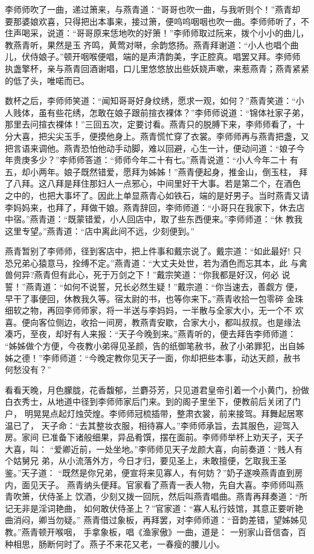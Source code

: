 李师师吹了一曲，递过箫来，与燕青道：“哥哥也吹一曲，与我听则个！”燕青却
要那婆娘欢喜，只得把出本事来，接过箫，便呜呜咽咽也吹一曲。李师师听了，不
住声喝采，说道：“哥哥原来恁地吹的好箫！”李师师取过阮来，拨个小小的曲儿，
教燕青听，果然是玉齐鸣，黄莺对啭，余韵悠扬。燕青拜谢道：“小人也唱个曲
儿，伏侍娘子。”顿开咽喉便唱，端的是声清韵美，字正腔真。唱罢又拜。李师师
执盏擎杯，亲与燕青回酒谢唱，口儿里悠悠放出些妖娆声嗽，来惹燕青；燕青紧紧
的低了头，唯喏而已。

数杯之后，李师师笑道：“闻知哥哥好身纹绣，愿求一观，如何？”燕青笑道：“小
人贱体，虽有些花绣，怎敢在娘子跟前揎衣裸体？”李师师说道：“锦体社家子弟，
那里去问揎衣裸体！”三回五次，定要讨看。燕青只的脱膊下来，李师师看了，十
分大喜，把尖尖玉手，便摸他身上。燕青慌忙穿了衣裳。李师师再与燕青把盏，又
把言语来调他。燕青恐怕他动手动脚，难以回避，心生一计，便动问道：“娘子今
年贵庚多少？”李师师答道：“师师今年二十有七。”燕青说道：“小人今年二十
有五，却小两年。娘子既然错爱，愿拜为姊姊！”燕青便起身，推金山，倒玉柱，
拜了八拜。这八拜是拜住那妇人一点邪心，中间里好干大事。若是第二个，在酒色
之中的，也把大事坏了。因此上单显燕青心如铁石，端的是好男子。当时燕青又请
李妈妈来，也拜了，拜做干娘。燕青辞回，李师师道：“小哥只在我家下，休去店
中宿。”燕青道：“既蒙错爱，小人回店中，取了些东西便来。”李师师道：“休
教我这里专望。”燕青道：“店中离此间不远，少刻便到。”

燕青暂别了李师师，径到客店中，把上件事和戴宗说了。戴宗道：“如此最好!
只恐兄弟心猿意马，拴缚不定。”燕青道：“大丈夫处世，若为酒色而忘其本，此
与禽兽何异?燕青但有此心，死于万剑之下！”戴宗笑道：“你我都是好汉，何必
说誓！”燕青道：“如何不说誓，兄长必然生疑！”戴宗道：“你当速去，善觑方
便，早干了事便回，休教我久等。宿太尉的书，也等你来下。”燕青收拾一包零碎
金珠细软之物，再回李师师家，将一半送与李妈妈，一半散与全家大小，无一个不
欢喜。便向客位侧边，收拾一间房，教燕青安歇，合家大小，都叫叔叔。也是缘法
凑巧，至夜，却好有人来报：“天子今晚到来。”燕青听的，便去拜告李师师道：
“姊姊做个方便，今夜教小弟得见圣颜，告的纸御笔赦书，赦了小弟罪犯，出自姊
姊之德！”李师师道：“今晚定教你见天子一面，你却把些本事，动达天颜，赦书
何愁没有？”

看看天晚，月色朦胧，花香馥郁，兰麝芬芳，只见道君皇帝引着一个小黄门，扮做
白衣秀士，从地道中径到李师师家后门来。到的阁子里坐下，便教前后关闭了门户，
明晃晃点起灯烛荧煌。李师师冠梳插带，整肃衣裳，前来接驾。拜舞起居寒温已了，
天子命：“去其整妆衣服，相待寡人。”李师师承旨，去其服色，迎驾入房。家间
已准备下诸般细果，异品肴馔，摆在面前。李师师举杯上劝天子，天子大喜，叫：
“爱卿近前，一处坐地。”李师师见天子龙颜大喜，向前奏道：“贱人有个姑舅兄
弟，从小流落外方，今日才归，要见圣上，未敢擅便，乞取我王圣鉴。”天子道：
“既然是你兄弟，便宣将来见寡人，有何妨？”奶子遂唤燕青直到房内，面见天子。
燕青纳头便拜。官家看了燕青一表人物，先自大喜。李师师叫燕青吹箫，伏侍圣上
饮酒，少刻又拨一回阮，然后叫燕青唱曲。燕青再拜奏道：“所记无非是淫词艳曲，
如何敢伏侍圣上？”官家道：“寡人私行妓馆，其意正要听艳曲消闷，卿当勿疑。”
燕青借过象板，再拜罢，对李师师道：“音韵差错，望姊姊见教。”燕青顿开喉咽，
手拿象板，唱《渔家傲》一曲，道是：
一别家山音信杳，百种相思，肠断何时了。燕子不来花又老，一春瘦的腰儿小。

